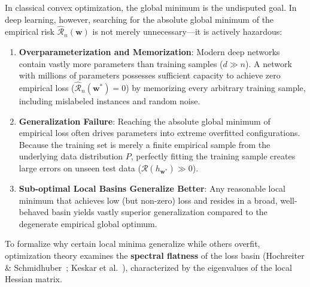 In classical convex optimization, the global minimum is the undisputed goal. In deep learning, however, searching for the absolute global minimum of the empirical risk $\hat{\mathcal{R}}_n(\mathbf{w})$ is not merely unnecessary---it is actively hazardous:
\begin{enumerate}
  \item \textbf{Overparameterization and Memorization}: Modern deep networks contain vastly more parameters than training samples ($d \gg n$). A network with millions of parameters possesses sufficient capacity to achieve zero empirical loss ($\hat{\mathcal{R}}_n(\mathbf{w}^*) = 0$) by memorizing every arbitrary training sample, including mislabeled instances and random noise.
  \item \textbf{Generalization Failure}: Reaching the absolute global minimum of empirical loss often drives parameters into extreme overfitted configurations. Because the training set is merely a finite empirical sample from the underlying data distribution $P$, perfectly fitting the training sample creates large errors on unseen test data ($\mathcal{R}(h_{\mathbf{w}^*}) \gg 0$).
  \item \textbf{Sub-optimal Local Basins Generalize Better}: Any reasonable local minimum that achieves low (but non-zero) loss and resides in a broad, well-behaved basin yields vastly superior generalization compared to the degenerate empirical global optimum.
\end{enumerate}

To formalize why certain local minima generalize while others overfit, optimization theory examines the \textbf{spectral flatness} of the loss basin (Hochreiter \& Schmidhuber~\cite{hochreiter1997flat}; Keskar et al.~\cite{keskar2017large}), characterized by the eigenvalues of the local Hessian matrix.


